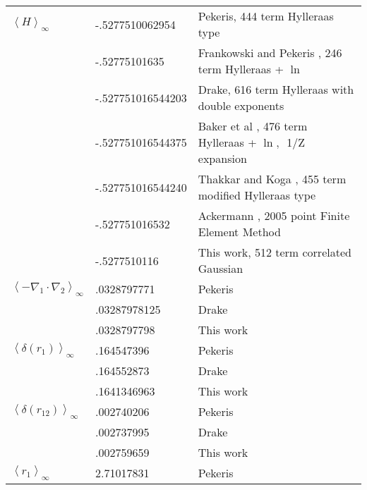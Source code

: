 \documentclass[12pt,thmsa]{article}
\begin{document}
\begin{table}[t] \centering%
\begin{tabular}{lll}
\hline\hline
$\left\langle H\right\rangle _\infty $ & -.5277510062954 & {\footnotesize %
Pekeris}\cite{Pekeris62}{\footnotesize , 444 term Hylleraas type} \\ 
& -.52775101635 & {\footnotesize Frankowski and Pekeris}\cite{Frankowski66}%
{\footnotesize , 246 term Hylleraas + }$\ln $ \\ 
& -.527751016544203 & {\footnotesize Drake}\cite{Drake88}{\footnotesize ,
616 term Hylleraas with double exponents} \\ 
& -.527751016544375 & {\footnotesize Baker et al }\cite{Baker90}%
{\footnotesize , 476 term Hylleraas + }$\ln ,${\footnotesize \ 1/Z expansion}
\\ 
& -.527751016544240 & {\footnotesize Thakkar and Koga}\cite{Thakkar94}%
{\footnotesize , 455 term modified Hylleraas type} \\ 
& -.527751016532 & {\footnotesize Ackermann}\cite{Ackermann95}{\footnotesize %
, 2005 point Finite Element Method} \\ 
& -.5277510116 & {\footnotesize This work, 512 term correlated Gaussian} \\ 
\hline
$\left\langle -\nabla _1\cdot \nabla _2\right\rangle _\infty $ & .0328797771
& {\footnotesize Pekeris}\cite{Pekeris62} \\ 
& .03287978125 & {\footnotesize Drake}\cite{Drake88} \\ 
& .0328797798 & {\footnotesize This work} \\ \hline
$\left\langle \delta \left( r_1\right) \right\rangle _\infty $ & .164547396
& {\footnotesize Pekeris}\cite{Pekeris62} \\ 
& .164552873 & {\footnotesize Drake}\cite{Drake88} \\ 
& .1641346963 & {\footnotesize This work} \\ \hline
$\left\langle \delta \left( r_{12}\right) \right\rangle _\infty $ & 
.002740206 & {\footnotesize Pekeris}\cite{Pekeris62} \\ 
& .002737995 & {\footnotesize Drake}\cite{Drake88} \\ 
& .002759659 & {\footnotesize This work} \\ \hline
$\left\langle r_1\right\rangle _\infty $ & 2.71017831 & {\footnotesize %
Pekeris}\cite{Pekeris62} \\ 

\end{tabular}
\end{table}
\end{document}

